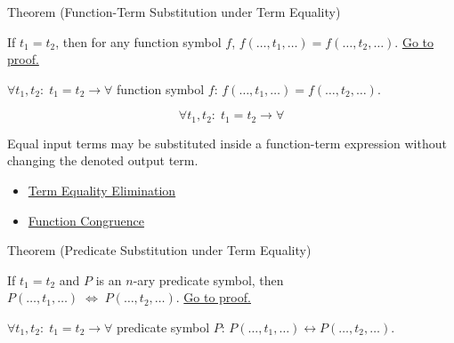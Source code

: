 \begin{theorembox}{Theorem (Function-Term Substitution under Term Equality)}
\begin{theorem}\label{thm:eq-term}
If $t_1 = t_2$, then for any function symbol $f$,
$f(\dots,t_1,\dots) = f(\dots,t_2,\dots)$.
\hyperref[prf:eq-term]{Go to proof.}
\end{theorem}
\end{theorembox}
\begin{remark*}
$\forall t_1, t_2:\; t_1=t_2 \to \forall$ function symbol $f$: $f(\dots,t_1,\dots) = f(\dots,t_2,\dots)$.
\end{remark*}

\begin{remark*}
\[
  \forall t_1, t_2:\; t_1=t_2 \to \forall
\]
\end{remark*}



\begin{remark*}[Interpretation]
Equal input terms may be substituted inside a function-term expression without
changing the denoted output term.
\end{remark*}



\begin{dependencies}
\begin{itemize}
  \item \hyperref[def:eq-elim]{Term Equality Elimination}
  \item \hyperref[thm:axiomatic-equality-function-congruence]{Function Congruence}
\end{itemize}
\end{dependencies}

\begin{theorembox}{Theorem (Predicate Substitution under Term Equality)}
\begin{theorem}\label{thm:eq-pred}
If $t_1 = t_2$ and $P$ is an $n$-ary predicate symbol, then
$P(\dots,t_1,\dots) \;\Leftrightarrow\; P(\dots,t_2,\dots)$.
\hyperref[prf:eq-pred]{Go to proof.}
\end{theorem}
\end{theorembox}
\begin{remark*}
$\forall t_1, t_2:\; t_1=t_2 \to \forall$ predicate symbol $P$: $P(\dots,t_1,\dots) \leftrightarrow P(\dots,t_2,\dots)$.
\end{remark*}

